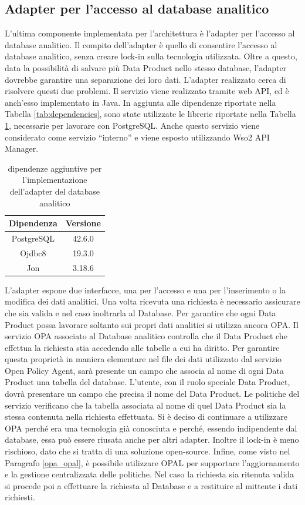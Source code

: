 \documentclass[a4paper,12pt]{report}
\begin{document}
\subsection{Adapter per l'accesso al database analitico}
L'ultima componente implementata per l'architettura è l'adapter per l'accesso al database analitico.
Il compito dell'adapter è quello di consentire l'accesso al database analitico, senza creare lock-in sulla tecnologia utilizzata.
Oltre a questo, data la possibilità di salvare più Data Product nello stesso database, l'adapter dovrebbe garantire una separazione dei loro dati.
L'adapter realizzato cerca di risolvere questi due problemi.
Il servizio viene realizzato tramite web API, ed è anch'esso implementato in Java.
In aggiunta alle dipendenze riportate nella Tabella \ref{tab:dependencies}, sono state utilizzate le librerie riportate nella Tabella \ref{tab:dependencies2}, necessarie per lavorare con PostgreSQL.
Anche questo servizio viene considerato come servizio ``interno'' e viene esposto utilizzando Wso2 API Manager.
\begin{table}
    \centering
    \begin{tabular}{|c|c|}
        \hline
        Dipendenza & Versione \\
        \hline
        PostgreSQL & 42.6.0 \\
        Ojdbc8 & 19.3.0 \\
        Jon & 3.18.6 \\
        \hline
    \end{tabular}
        \caption{dipendenze aggiuntive per l'implementazione dell'adapter del database analitico}
        \label{tab:dependencies2}
\end{table}
L'adapter espone due interfacce, una per l'accesso e una per l'inserimento o la modifica dei dati analitici.
Una volta ricevuta una richiesta è necessario assicurare che sia valida e nel caso inoltrarla al Database.
Per garantire che ogni Data Product possa lavorare soltanto sui propri dati analitici si utilizza ancora OPA.
Il servizio OPA associato al Database analitico controlla che il Data Product che effettua la richiesta stia accedendo alle tabelle a cui ha diritto.
Per garantire questa proprietà in maniera elementare nel file dei dati utilizzato dal servizio Open Policy Agent, sarà presente un campo che associa al nome di ogni Data Product una tabella del database.
L'utente, con il ruolo speciale Data Product, dovrà presentare un campo che precisa il nome del Data Product.
Le politiche del servizio verificano che la tabella associata al nome di quel Data Product sia la stessa contenuta nella richiesta effettuata.
Si è deciso di continuare a utilizzare OPA perché era una tecnologia già conosciuta e perché, essendo indipendente dal database, essa può essere riusata anche per altri adapter.
Inoltre il lock-in è meno rischioso, dato che si tratta di una soluzione open-source. 
Infine, come visto nel Paragrafo \ref{opa_opal}, è possibile utilizzare OPAL per supportare l'aggiornamento e la gestione centralizzata delle politiche.
Nel caso la richiesta sia ritenuta valida si procede poi a effettuare la richiesta al Database e a restituire al mittente i dati richiesti.
\end{document}
